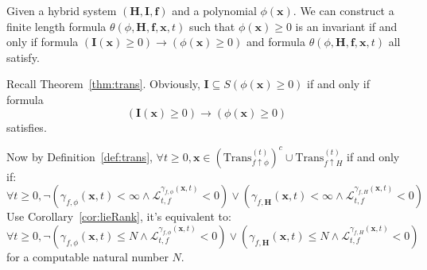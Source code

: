 \documentclass{jssc}
\begin{document}
\begin{theorem}
\label{thm:translate}
Given a hybrid system $(\boldsymbol{H}, \boldsymbol{I}, \boldsymbol{f})$ and a polynomial $\phi(\boldsymbol{x})$. We can construct a finite length formula $\theta(\phi ,\boldsymbol{H}, \boldsymbol{f}, \boldsymbol{x}, t)$ such that $\phi(\boldsymbol{x}) \geq 0$ is an invariant if and only if formula
		$(\boldsymbol{I}(\boldsymbol{x}) \geq 0) \rightarrow (\phi(\boldsymbol{x}) \geq 0)$
and formula
		$\theta(\phi ,\boldsymbol{H}, \boldsymbol{f}, \boldsymbol{x}, t)$
all satisfy.
\end{theorem}

\proof
Recall Theorem~\ref{thm:trans}. Obviously, $\boldsymbol{I} \subseteq S(\phi(\boldsymbol{x}) \geq 0)$ if and only if formula
	\begin{equation*}
		(\boldsymbol{I}(\boldsymbol{x}) \geq 0) \rightarrow (\phi(\boldsymbol{x}) \geq 0)
	\end{equation*}
satisfies.

Now by Definition~\ref{def:trans}, $\forall t \geq 0, \boldsymbol{x} \in (\mathrm{Trans}_{f \uparrow \phi}^{(t)})^c \cup \mathrm{Trans}_{f \uparrow H}^{(t)}$ if and only if:
	\begin{equation*}
		\forall t \geq 0, \neg(\gamma_{f, \phi}(\boldsymbol{x}, t) < \infty \wedge \mathcal{L}_{t, f}^{\gamma_{f, \phi}(\boldsymbol{x}, t)} < 0) \vee (\gamma_{f, \boldsymbol{H}}(\boldsymbol{x}, t) < \infty \wedge \mathcal{L}_{t, f}^{\gamma_{f, H}(\boldsymbol{x}, t)} <0)
	\end{equation*}
Use Corollary~\ref{cor:lieRank}, it's equivalent to:
	\begin{equation*}
		\forall t \geq 0, \neg(\gamma_{f, \phi}(\boldsymbol{x}, t) \leq N \wedge \mathcal{L}_{t, f}^{\gamma_{f, \phi}(\boldsymbol{x}, t)} < 0) \vee (\gamma_{f, \boldsymbol{H}}(\boldsymbol{x}, t) \leq N \wedge \mathcal{L}_{t, f}^{\gamma_{f, H}(\boldsymbol{x}, t)} <0)
	\end{equation*}
for a computable natural number $N$.
\end{document}
